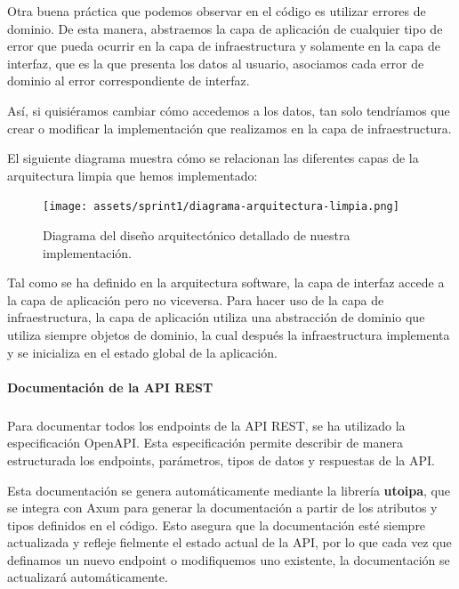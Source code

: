 Otra buena práctica que podemos observar en el código es utilizar errores de dominio. De esta manera, abstraemos la capa de aplicación de cualquier tipo de error que pueda ocurrir en la capa de infraestructura y solamente en la capa de interfaz, que es la que presenta los datos al usuario, asociamos cada error de dominio al error correspondiente de interfaz.

Así, si quisiéramos cambiar cómo accedemos a los datos, tan solo tendríamos que crear o modificar la implementación que realizamos en la capa de infraestructura.

El siguiente diagrama muestra cómo se relacionan las diferentes capas de la arquitectura limpia que hemos implementado:
\begin{figure}[H]
    \begin{center}
        \texttt{[image: assets/sprint1/diagrama-arquitectura-limpia.png]}
    \end{center}
    \caption{Diagrama del diseño arquitectónico detallado de nuestra implementación.}\label{fig:diagrama-arquitectura-limpia-sprint1}
\end{figure}

Tal como se ha definido en la arquitectura software, la capa de interfaz accede a la capa de aplicación pero no viceversa. Para hacer uso de la capa de infraestructura, la capa de aplicación utiliza una abstracción de dominio que utiliza siempre objetos de dominio, la cual después la infraestructura implementa y se inicializa en el estado global de la aplicación.

\paragraph{Documentación de la API REST}
\subparagraph{}

Para documentar todos los endpoints de la API REST, se ha utilizado la especificación OpenAPI. Esta especificación permite describir de manera estructurada los endpoints, parámetros, tipos de datos y respuestas de la API.

Esta documentación se genera automáticamente mediante la librería \textbf{utoipa}, que se integra con Axum para generar la documentación a partir de los atributos y tipos definidos en el código. 
Esto asegura que la documentación esté siempre actualizada y refleje fielmente el estado actual de la API, por lo que cada vez que definamos un nuevo endpoint o modifiquemos uno existente, la documentación se actualizará automáticamente.

